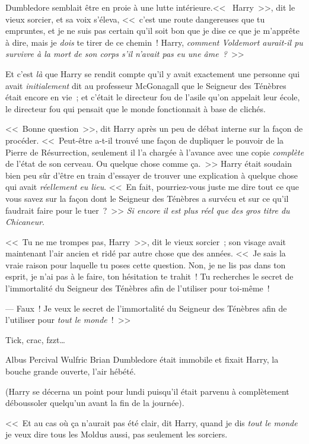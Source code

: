 Dumbledore semblait être en proie à une lutte intérieure.<<~ Harry~>>, dit le vieux sorcier, et sa voix s'éleva, <<~c'est une route dangereuses que tu empruntes, et je ne suis pas certain qu'il soit bon que je dise ce que je m'apprête à dire, mais je \emph{dois} te tirer de ce chemin~! Harry, \emph{comment Voldemort aurait-il pu survivre à la mort de son corps s'il n'avait pas eu une âme~?}~>>

Et c'est \emph{là} que Harry se rendit compte qu'il y avait exactement une personne qui avait \emph{initialement} dit au professeur McGonagall que le Seigneur des Ténèbres était encore en vie~; et c'était le directeur fou de l'asile qu'on appelait leur école, le directeur fou qui pensait que le monde fonctionnait à base de clichés.

<<~Bonne question~>>, dit Harry après un peu de débat interne sur la façon de procéder. <<~Peut-être a-t-il trouvé une façon de dupliquer le pouvoir de la Pierre de Résurrection, seulement il l'a chargée à l'avance avec une copie \emph{complète} de l'état de son cerveau. Ou quelque chose comme ça.~>> Harry était soudain bien peu sûr d'être en train d'essayer de trouver une explication à quelque chose qui avait \emph{réellement eu lieu}. <<~En fait, pourriez-vous juste me dire tout ce que vous savez sur la façon dont le Seigneur des Ténèbres a survécu et sur ce qu'il faudrait faire pour le tuer~?~>> \emph{Si encore il est plus réel que des gros titre du Chicaneur}.

<<~Tu ne me trompes pas, Harry~>>, dit le vieux sorcier~; son visage avait maintenant l'air ancien et ridé par autre chose que des années. <<~Je sais la vraie raison pour laquelle tu poses cette question. Non, je ne lis pas dans ton esprit, je n'ai pas à le faire, ton hésitation te trahit~! Tu recherches le secret de l'immortalité du Seigneur des Ténèbres afin de l'utiliser pour toi-même~!

--- Faux~! Je veux le secret de l'immortalité du Seigneur des Ténèbres afin de l'utiliser pour \emph{tout le monde}~!~>>

\later

Tick, crac, fzzt…

Albus Percival Wulfric Brian Dumbledore était immobile et fixait Harry, la bouche grande ouverte, l'air hébété.

(Harry se décerna un point pour lundi puisqu'il était parvenu à complètement déboussoler quelqu'un avant la fin de la journée).

<<~Et au cas où ça n'aurait pas été clair, dit Harry, quand je dis \emph{tout le monde} je veux dire tous les Moldus aussi, pas seulement les sorciers.

